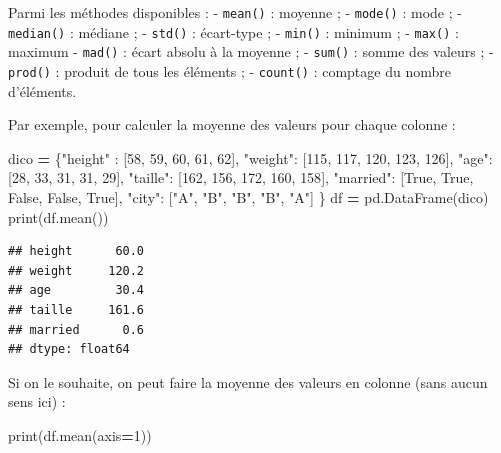 \documentclass[12pt,]{book}
\newenvironment{Shaded}{\begin{snugshade}}{\end{snugshade}}
\newcommand{\DecValTok}[1]{\textcolor[rgb]{0.00,0.00,0.81}{#1}}
\newcommand{\StringTok}[1]{\textcolor[rgb]{0.31,0.60,0.02}{#1}}
\newcommand{\VariableTok}[1]{\textcolor[rgb]{0.00,0.00,0.00}{#1}}
\newcommand{\OperatorTok}[1]{\textcolor[rgb]{0.81,0.36,0.00}{\textbf{#1}}}
\newcommand{\BuiltInTok}[1]{#1}
\newcommand{\NormalTok}[1]{#1}
\numberwithin{equation}{section}
\numberwithin{countremarque}{section}
\begin{document}
Parmi les méthodes disponibles : - \texttt{mean()} : moyenne ; -
\texttt{mode()} : mode ; - \texttt{median()} : médiane ; -
\texttt{std()} : écart-type ; - \texttt{min()} : minimum ; -
\texttt{max()} : maximum - \texttt{mad()} : écart absolu à la moyenne ;
- \texttt{sum()} : somme des valeurs ; - \texttt{prod()} : produit de
tous les éléments ; - \texttt{count()} : comptage du nombre d'éléments.

Par exemple, pour calculer la moyenne des valeurs pour chaque colonne :

\begin{Shaded}
\begin{Highlighting}[]
\NormalTok{dico }\OperatorTok{=}\NormalTok{ \{}\StringTok{"height"}\NormalTok{ : [}\DecValTok{58}\NormalTok{, }\DecValTok{59}\NormalTok{, }\DecValTok{60}\NormalTok{, }\DecValTok{61}\NormalTok{, }\DecValTok{62}\NormalTok{],}
        \StringTok{"weight"}\NormalTok{: [}\DecValTok{115}\NormalTok{, }\DecValTok{117}\NormalTok{, }\DecValTok{120}\NormalTok{, }\DecValTok{123}\NormalTok{, }\DecValTok{126}\NormalTok{],}
        \StringTok{"age"}\NormalTok{: [}\DecValTok{28}\NormalTok{, }\DecValTok{33}\NormalTok{, }\DecValTok{31}\NormalTok{, }\DecValTok{31}\NormalTok{, }\DecValTok{29}\NormalTok{],}
        \StringTok{"taille"}\NormalTok{: [}\DecValTok{162}\NormalTok{, }\DecValTok{156}\NormalTok{, }\DecValTok{172}\NormalTok{, }\DecValTok{160}\NormalTok{, }\DecValTok{158}\NormalTok{],}
        \StringTok{"married"}\NormalTok{: [}\VariableTok{True}\NormalTok{, }\VariableTok{True}\NormalTok{, }\VariableTok{False}\NormalTok{, }\VariableTok{False}\NormalTok{, }\VariableTok{True}\NormalTok{],}
        \StringTok{"city"}\NormalTok{: [}\StringTok{"A"}\NormalTok{, }\StringTok{"B"}\NormalTok{, }\StringTok{"B"}\NormalTok{, }\StringTok{"B"}\NormalTok{, }\StringTok{"A"}\NormalTok{]}
\NormalTok{       \} }
\NormalTok{df }\OperatorTok{=}\NormalTok{ pd.DataFrame(dico)}
\BuiltInTok{print}\NormalTok{(df.mean())}
\end{Highlighting}
\end{Shaded}

\begin{lstlisting}
## height      60.0
## weight     120.2
## age         30.4
## taille     161.6
## married      0.6
## dtype: float64
\end{lstlisting}

Si on le souhaite, on peut faire la moyenne des valeurs en colonne (sans
aucun sens ici) :

\begin{Shaded}
\begin{Highlighting}[]
\BuiltInTok{print}\NormalTok{(df.mean(axis}\OperatorTok{=}\DecValTok{1}\NormalTok{))}
\end{Highlighting}
\end{Shaded}
\end{document}
